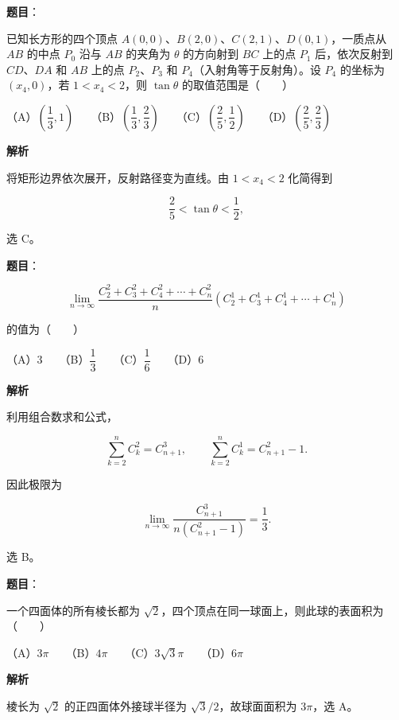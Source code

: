 \begin{answer}

\textbf{题目}：

已知长方形的四个顶点 $A(0,0)\text{、}B(2,0)\text{、}C(2,1)\text{、}D(0,1)$，一质点从 $AB$ 的中点 $P_0$ 沿与 $AB$ 的夹角为 $\theta$ 的方向射到 $BC$ 上的点 $P_1$ 后，依次反射到 $CD\text{、}DA$ 和 $AB$ 上的点 $P_2\text{、}P_3$ 和 $P_4$（入射角等于反射角）。设 $P_4$ 的坐标为 $(x_4,0)$，若 $1<x_4<2$，则 $\tan\theta$ 的取值范围是\mbox{（　　）}

（A）$\left(\dfrac13,1\right)$　　（B）$\left(\dfrac13,\dfrac23\right)$　　（C）$\left(\dfrac25,\dfrac12\right)$　　（D）$\left(\dfrac25,\dfrac23\right)$

\textbf{解析}

将矩形边界依次展开，反射路径变为直线。由 $1<x_4<2$ 化简得到

\nopagebreak[4]
\[
\frac25<\tan\theta<\frac12,
\]

选 C。


\end{answer}
\begin{answer}

\textbf{题目}：

\nopagebreak[4]
\[
\lim_{n\to\infty}
\frac{C_2^2+C_3^2+C_4^2+\cdots+C_n^2}
n(C_2^1+C_3^1+C_4^1+\cdots+C_n^1)
\]

的值为\mbox{（　　）}

（A）$3$　　（B）$\dfrac13$　　（C）$\dfrac16$　　（D）$6$

\textbf{解析}

利用组合数求和公式，

\nopagebreak[4]
\[
\sum_{k=2}^{n}C_k^2=C_{n+1}^3,\qquad
\sum_{k=2}^{n}C_k^1=C_{n+1}^2-1.
\]

因此极限为

\nopagebreak[4]
\[
\lim_{n\to\infty}\frac{C_{n+1}^3}{n(C_{n+1}^2-1)}
=\frac13.
\]

选 B。


\end{answer}
\begin{answer}

\textbf{题目}：

一个四面体的所有棱长都为 $\sqrt2$，四个顶点在同一球面上，则此球的表面积为\mbox{（　　）}

（A）$3\pi$　　（B）$4\pi$　　（C）$3\sqrt3\pi$　　（D）$6\pi$

\textbf{解析}

棱长为 $\sqrt2$ 的正四面体外接球半径为 $\sqrt3/2$，故球面面积为 $3\pi$，选 A。


\end{answer}

